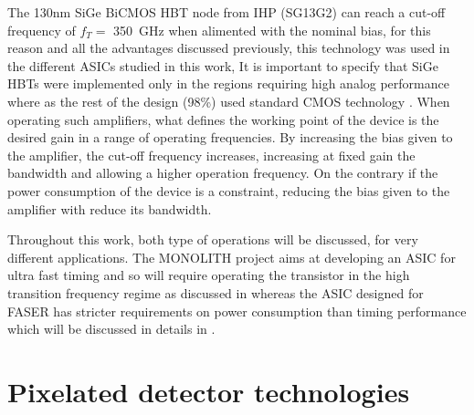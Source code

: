 		The 130nm SiGe BiCMOS HBT node from IHP (SG13G2) can reach a cut-off frequency of $f_T = $ \SI{350}{ \giga\hertz} when alimented with the nominal bias, for this reason and all the advantages discussed previously, this technology was used in the different ASICs studied in this work, It is important to specify that SiGe HBTs were implemented only in the regions requiring high analog performance where as the rest of the design (98\%) used standard CMOS technology \cite{Picardi_thesis}. When operating such amplifiers, what defines the working point of the device is the desired gain in a range of operating frequencies. By increasing the bias given to the amplifier, the cut-off frequency increases, increasing at fixed gain the bandwidth and allowing a higher operation frequency. On the contrary if the power consumption of the device is a constraint, reducing the bias given to the amplifier with reduce its bandwidth. 
		
		Throughout this work, both type of operations will be discussed, for very different applications. The MONOLITH project aims at developing an ASIC for ultra fast timing and so will require operating the transistor in the high transition frequency regime as discussed in  whereas the ASIC designed for FASER has stricter requirements on power consumption than timing performance which will be discussed in details in .   
		
		
		\clearpage

	\section{Pixelated detector technologies }\label{sec:2.4}
	
